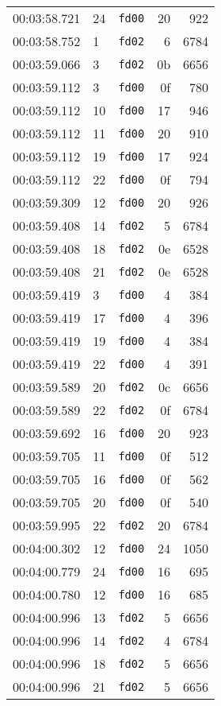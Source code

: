 \documentclass{article}
\begin{document}
\begin{longtable}{lllrr}
00:03:58.721 & 24 & \texttt{fd00} & 20 & 922 \\
00:03:58.752 & 1 & \texttt{fd02} & 6 & 6784 \\
00:03:59.066 & 3 & \texttt{fd02} & 0b & 6656 \\
00:03:59.112 & 3 & \texttt{fd00} & 0f & 780 \\
00:03:59.112 & 10 & \texttt{fd00} & 17 & 946 \\
00:03:59.112 & 11 & \texttt{fd00} & 20 & 910 \\
00:03:59.112 & 19 & \texttt{fd00} & 17 & 924 \\
00:03:59.112 & 22 & \texttt{fd00} & 0f & 794 \\
00:03:59.309 & 12 & \texttt{fd00} & 20 & 926 \\
00:03:59.408 & 14 & \texttt{fd02} & 5 & 6784 \\
00:03:59.408 & 18 & \texttt{fd02} & 0e & 6528 \\
00:03:59.408 & 21 & \texttt{fd02} & 0e & 6528 \\
00:03:59.419 & 3 & \texttt{fd00} & 4 & 384 \\
00:03:59.419 & 17 & \texttt{fd00} & 4 & 396 \\
00:03:59.419 & 19 & \texttt{fd00} & 4 & 384 \\
00:03:59.419 & 22 & \texttt{fd00} & 4 & 391 \\
00:03:59.589 & 20 & \texttt{fd02} & 0c & 6656 \\
00:03:59.589 & 22 & \texttt{fd02} & 0f & 6784 \\
00:03:59.692 & 16 & \texttt{fd00} & 20 & 923 \\
00:03:59.705 & 11 & \texttt{fd00} & 0f & 512 \\
00:03:59.705 & 16 & \texttt{fd00} & 0f & 562 \\
00:03:59.705 & 20 & \texttt{fd00} & 0f & 540 \\
00:03:59.995 & 22 & \texttt{fd02} & 20 & 6784 \\
00:04:00.302 & 12 & \texttt{fd00} & 24 & 1050 \\
00:04:00.779 & 24 & \texttt{fd00} & 16 & 695 \\
00:04:00.780 & 12 & \texttt{fd00} & 16 & 685 \\
00:04:00.996 & 13 & \texttt{fd02} & 5 & 6656 \\
00:04:00.996 & 14 & \texttt{fd02} & 4 & 6784 \\
00:04:00.996 & 18 & \texttt{fd02} & 5 & 6656 \\
00:04:00.996 & 21 & \texttt{fd02} & 5 & 6656 \\

\end{longtable}
\end{document}
